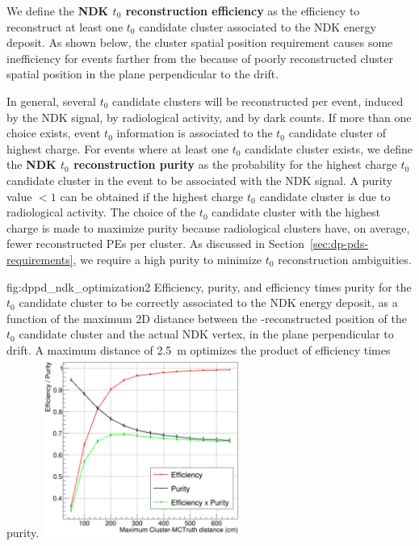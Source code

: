 We define the {\bf NDK $t_0$ reconstruction efficiency} as the efficiency to reconstruct at least one $t_0$ candidate cluster associated to the NDK energy deposit. As shown below, the cluster spatial position requirement causes some inefficiency for events farther from the  because of poorly reconstructed cluster spatial position in the plane perpendicular to the drift.

In general, several $t_0$ candidate clusters will be reconstructed per event, induced by the NDK signal, by radiological activity, and by  dark counts. If more than one choice exists, event $t_0$ information is associated to the $t_0$ candidate cluster of highest charge. For events where at least one $t_0$ candidate cluster exists, we define the {\bf NDK $t_0$ reconstruction purity} as the probability for the highest charge $t_0$ candidate cluster in the event to be associated with the NDK signal. A purity value $<1$ can be obtained if the highest charge $t_0$ candidate cluster is due to radiological activity. The choice of the $t_0$ candidate cluster with the highest charge is made to maximize purity because radiological clusters have, on average, fewer reconstructed PEs per cluster. As discussed in Section~\ref{sec:dp-pds-requirements}, we require a high purity to minimize $t_0$ reconstruction ambiguities.
%

\begin{dunefigure}{fig:dppd_ndk_optimization2}
{Efficiency, purity, and efficiency times purity for the $t_0$ candidate cluster to be correctly associated to the NDK energy deposit, as a function of the maximum 2D distance between the -reconstructed position of the $t_0$ candidate cluster and the actual NDK vertex, in the plane perpendicular to drift. A maximum distance of \SI{2.5}{\m} optimizes the product of efficiency times purity.}
\includegraphics[width=0.5\textwidth]{graphics/dppd_ndk_optimization2.pdf}
\end{dunefigure}

